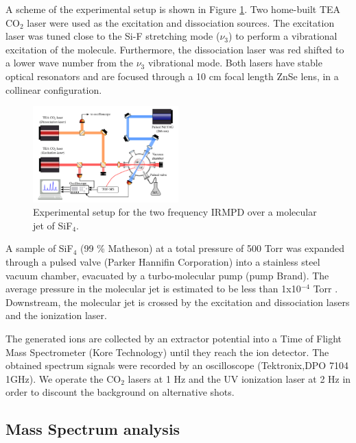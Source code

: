 \documentclass[global,twocolumn]{svjour}
\begin{document}
A scheme of the experimental setup is shown in Figure \ref{fig:setup}. Two home-built TEA CO$_{2}$ laser were used as the excitation and dissociation sources. The excitation laser was tuned close to the Si-F stretching mode ($\nu_{3}$) to perform a vibrational excitation of the molecule. Furthermore, the dissociation laser was red shifted to a lower wave number from the $\nu_{3}$ vibrational mode. Both lasers have stable optical resonators and are focused through a 10 cm focal length ZnSe lens, in a collinear configuration.     

\begin{figure}[h]
	\includegraphics[width = 0.5\textwidth]{figures/dispositivo_2f_english.pdf}%
	\caption{\label{fig:setup} Experimental setup for the two frequency IRMPD over a molecular jet of SiF$_{4}$.}
\end{figure}

A sample of SiF$_{4}$ (99 \% Matheson) at a total pressure of 500 Torr was expanded through a pulsed valve (Parker Hannifin Corporation) into a stainless steel vacuum chamber, evacuated by a turbo-molecular pump (pump Brand). The average pressure in the molecular jet is estimated to be less than 1x10$^{-4}$ Torr \cite{bishop09}. Downstream, the molecular jet is crossed by the excitation and dissociation lasers and the ionization laser.

The generated ions are collected by an extractor potential into a Time of Flight Mass Spectrometer (Kore Technology) until they reach the ion detector. The obtained spectrum signals were recorded by an oscilloscope (Tektronix,DPO 7104 1GHz). We operate the CO$_{2}$ lasers at 1 Hz and the UV ionization laser at 2 Hz in order to discount the background on alternative shots. 

\subsection{Mass Spectrum analysis}
\end{document}
